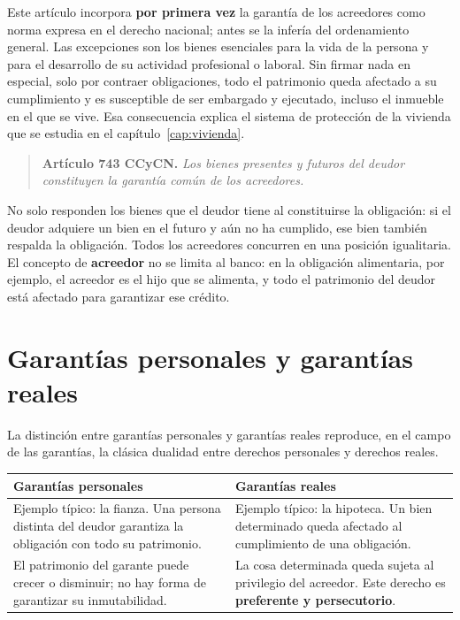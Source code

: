 \documentclass[12pt,oneside]{book}
\begin{document}
Este artículo incorpora \textbf{por primera vez} la garantía de los acreedores como norma expresa en el derecho nacional; antes se la infería del ordenamiento general. Las excepciones son los bienes esenciales para la vida de la persona y para el desarrollo de su actividad profesional o laboral. Sin firmar nada en especial, solo por contraer obligaciones, todo el patrimonio queda afectado a su cumplimiento y es susceptible de ser embargado y ejecutado, incluso el inmueble en el que se vive. Esa consecuencia explica el sistema de protección de la vivienda que se estudia en el capítulo~\ref{cap:vivienda}.

\begin{quote}
\textbf{Artículo 743 CCyCN.} \textit{Los bienes presentes y futuros del deudor constituyen la garantía común de los acreedores.}
\end{quote}

No solo responden los bienes que el deudor tiene al constituirse la obligación: si el deudor adquiere un bien en el futuro y aún no ha cumplido, ese bien también respalda la obligación. Todos los acreedores concurren en una posición igualitaria. El concepto de \textbf{acreedor} no se limita al banco: en la obligación alimentaria, por ejemplo, el acreedor es el hijo que se alimenta, y todo el patrimonio del deudor está afectado para garantizar ese crédito.

\section{Garantías personales y garantías reales}

La distinción entre garantías personales y garantías reales reproduce, en el campo de las garantías, la clásica dualidad entre derechos personales y derechos reales.

\begin{table}[H]
\centering
\begin{tabularx}{\textwidth}{@{}LL@{}}
\toprule
\textbf{Garantías personales} & \textbf{Garantías reales} \\
\midrule
Ejemplo típico: la fianza. Una persona distinta del deudor garantiza la obligación con todo su patrimonio. & Ejemplo típico: la hipoteca. Un bien determinado queda afectado al cumplimiento de una obligación. \\
\addlinespace
El patrimonio del garante puede crecer o disminuir; no hay forma de garantizar su inmutabilidad. & La cosa determinada queda sujeta al privilegio del acreedor. Este derecho es \textbf{preferente y persecutorio}. \\
\bottomrule
\end{tabularx}
\end{table}
\end{document}
